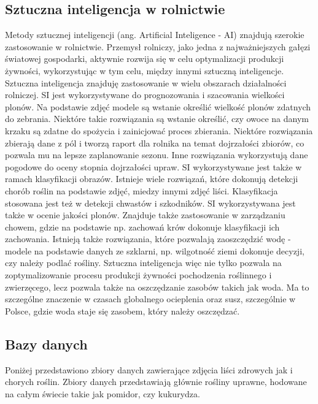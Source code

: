 \subsection{Sztuczna inteligencja w rolnictwie}
Metody sztucznej inteligencji (ang. Artificial Inteligence - AI) znajdują szerokie zastosowanie w rolnictwie. Przemysł rolniczy, jako jedna z najważniejszych gałęzi światowej gospodarki, aktywnie rozwija się w celu optymalizacji produkcji żywności, wykorzystując w tym celu, między innymi sztuczną inteligencje. Sztuczna inteligencja znajduję zastosowanie w wielu obszarach działalności rolniczej. SI jest wykorzystywane do prognozowania i szacowania wielkości plonów. Na podstawie zdjęć modele są wstanie określić wielkość plonów zdatnych do zebrania. Niektóre takie rozwiązania są wstanie określić, czy owoce na danym krzaku są zdatne do spożycia i zainicjować proces zbierania. Niektóre rozwiązania zbierają dane z pól i tworzą raport dla rolnika na temat dojrzałości zbiorów, co pozwala mu na lepsze zaplanowanie sezonu. Inne rozwiązania wykorzystują dane pogodowe do oceny stopnia dojrzałości upraw. SI wykorzystywane jest także w ramach klasyfikacji obrazów. Istnieje wiele rozwiązań, które dokonują detekcji chorób roślin na podstawie zdjęć, miedzy innymi zdjęć liści. Klasyfikacja stosowana jest też w detekcji chwastów i szkodników. SI wykorzystywana jest także w ocenie jakości plonów. Znajduje także zastosowanie w zarządzaniu chowem, gdzie na podstawie np. zachowań krów dokonuje klasyfikacji ich zachowania. Istnieją także rozwiązania, które pozwalają zaoszczędzić wodę - modele na podstawie danych ze szklarni, np. wilgotność ziemi dokonuje decyzji, czy należy podlać rośliny. Sztuczna inteligencja więc nie tylko pozwala na zoptymalizowanie procesu produkcji żywności pochodzenia roślinnego i zwierzęcego, lecz pozwala także na oszczędzanie zasobów takich jak woda. Ma to szczególne znaczenie w czasach globalnego ocieplenia oraz susz, szczególnie w Polsce, gdzie woda staje się zasobem, który należy oszczędzać. \cite{liakos2018mlagriculture}
\subsection{Bazy danych}
Poniżej przedstawiono zbiory danych zawierające zdjęcia liści  zdrowych jak i chorych roślin. Zbiory danych przedstawiają głównie rośliny uprawne, hodowane na całym świecie takie jak pomidor, czy kukurydza.

